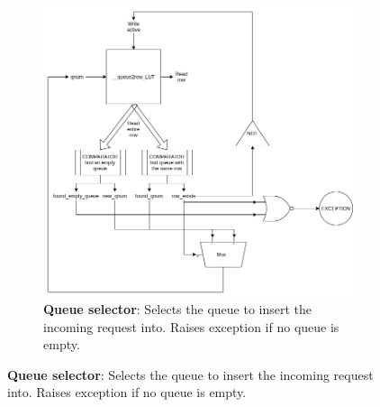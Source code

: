 \documentclass[hidelinks,12pt]{article}
\begin{document}
\begin{figure}[H]
\begin{subfigure}[h]{\textwidth}
\begin{center}
        \end{center}

    \end{subfigure}

\end{figure}

\begin{figure}[H]
    \ContinuedFloat
    \centering

    \begin{subfigure}[h]{\textwidth}
        \begin{center}
            \includegraphics[scale=0.65]{img/queue_selector.png}
            \caption{\textbf{Queue selector}: Selects the queue to insert the incoming request into. Raises exception if no queue is empty.}

        \end{center}

    \end{subfigure}
\end{figure}
\end{document}
